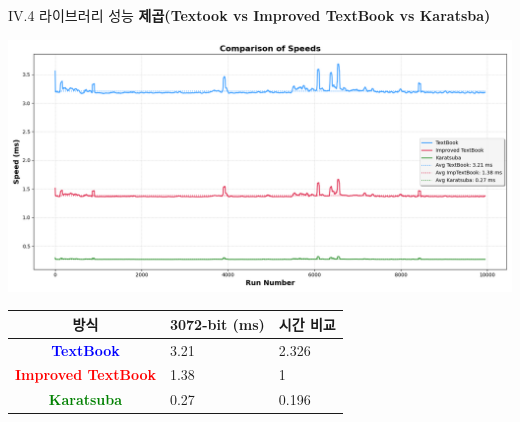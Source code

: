 \documentclass{beamer}
\begin{document}
\begin{frame}{IV.4 라이브러리 성능}
	\alert{\bf 제곱(Textook vs Improved TextBook vs Karatsba)}\\
	\begin{center}
		\includegraphics[width=\linewidth,height=.525\textheight]{mul_3072_2.png}
	\end{center}
	\begin{center}
		\begin{tabularx}{\textwidth}{c||XX}
			\hline
			방식 & 3072-bit (ms) & 시간 비교\\
			\midrule
			\textcolor{blue}{\bf TextBook} & 3.21 & 2.326 \\
			\textcolor{red}{\bf Improved TextBook} & 1.38 & 1\\
			\textcolor{green}{\bf Karatsuba} & 0.27 & 0.196\\
			\hline
		\end{tabularx}
	\end{center}
\end{frame}
\end{document}
